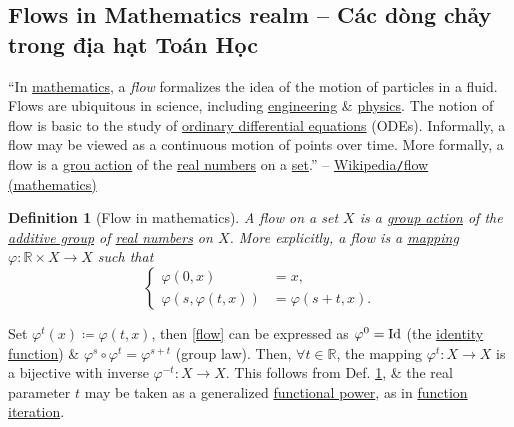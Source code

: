 \documentclass[12pt,twoside]{book}
\newtheorem{definition}{Definition}[section]
\begin{document}
\subsection{Flows in Mathematics realm -- Các dòng chảy trong địa hạt Toán Học}
``In \href{https://en.wikipedia.org/wiki/Mathematics}{mathematics},  a {\it flow} formalizes the idea of the motion of particles in a fluid. Flows are ubiquitous in science, including \href{https://en.wikipedia.org/wiki/Engineering}{engineering} \& \href{https://en.wikipedia.org/wiki/Physics}{physics}. The notion of flow is basic to the study of \href{https://en.wikipedia.org/wiki/Ordinary_differential_equation}{ordinary differential equations} (ODEs). Informally, a flow may be viewed as a continuous motion of points over time. More formally, a flow is a \href{https://en.wikipedia.org/wiki/Group_action_(mathematics)}{grou action} of the \href{https://en.wikipedia.org/wiki/Real_number}{real numbers} on a \href{https://en.wikipedia.org/wiki/Set_(mathematics)}{set}.'' -- \href{https://en.wikipedia.org/wiki/Flow_(mathematics)}{Wikipedia{\tt/}flow (mathematics)}

\begin{definition}[Flow in mathematics]
	\label{def: flow}
	A \emph{flow} on a set $X$ is a \href{https://en.wikipedia.org/wiki/Group_action_(mathematics)}{group action} of the \href{https://en.wikipedia.org/wiki/Additive_group}{additive group} of \href{https://en.wikipedia.org/wiki/Real_number}{real numbers} on $X$. More explicitly, a flow is a \href{https://en.wikipedia.org/wiki/Function_(mathematics)}{mapping} $\varphi:\mathbb{R}\times X\to X$ such that
	\begin{equation}
		\label{flow}
		\tag{fl}
		\left\{\begin{split}
			\varphi(0,x) &= x,\\
			\varphi(s,\varphi(t,x)) &= \varphi(s + t,x).
		\end{split}\right.
	\end{equation}
\end{definition}
Set $\varphi^t(x)\coloneqq\varphi(t,x)$, then \eqref{flow} can be expressed as $\varphi^0 = {\rm Id}$ (the \href{https://en.wikipedia.org/wiki/Identity_function}{identity function}) \& $\varphi^s\circ\varphi^t = \varphi^{s + t}$ (group law). Then, $\forall t\in\mathbb{R}$, the mapping $\varphi^t:X\to X$ is a bijective with inverse $\varphi^{-t}:X\to X$. This follows from Def. \ref{def: flow}, \& the real parameter $t$ may be taken as a generalized \href{https://en.wikipedia.org/wiki/Functional_power}{functional power}, as in \href{https://en.wikipedia.org/wiki/Function_iteration}{function iteration}.
\end{document}
